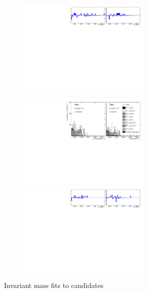 \begin{figure}[!h]
\begin{subfigure}[t]{1.0\textwidth}
        \includegraphics[width=0.7\textwidth]{figs/Appendix_FitCategories/residuals_DsPhi_Ds2PhiPi_both_summed_splitHel_splitKKPi_s21_s21r1_s24_s26.pdf}
    \end{subfigure}
    \begin{subfigure}[t]{1.0\textwidth}
        \centering
        \includegraphics[width=0.7\textwidth]{figs/Appendix_FitCategories/canvas_DsPhiSide_Ds2PhiPi_both_summed_splitHel_splitKKPi_s21_s21r1_s24_s26.pdf}\\
        \includegraphics[width=0.7\textwidth]{figs/Appendix_FitCategories/residuals_DsPhiSide_Ds2PhiPi_both_summed_splitHel_splitKKPi_s21_s21r1_s24_s26.pdf}
    \end{subfigure}
    \caption{Invariant mass fits to \decay{\Bp}{\Dsp\phiz} candidates}
\end{figure}

